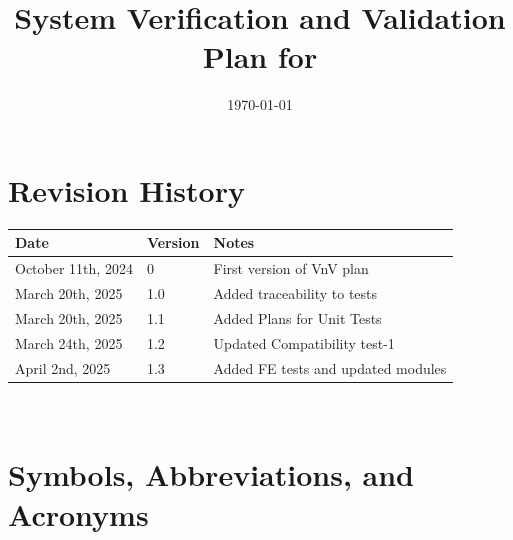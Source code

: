 \documentclass[12pt, titlepage]{article}
\begin{document}
\title{System Verification and Validation Plan for \progname{}} 
\author{\authname}
\date{\today}
	
\maketitle


\section*{Revision History}

\begin{tabularx}{\textwidth}{p{3cm}p{2cm}X}
\toprule {\bf Date} & {\bf Version} & {\bf Notes}\\
\midrule
October 11th, 2024 & 0 & First version of VnV plan\\
March 20th, 2025 & 1.0 & Added traceability to tests\\
March 20th, 2025 & 1.1 & Added Plans for Unit Tests\\
March 24th, 2025 & 1.2 & Updated Compatibility test-1 \\
April 2nd, 2025 & 1.3 & Added FE tests and updated modules\\
\bottomrule
\end{tabularx}

~\\

\newpage

\tableofcontents

\listoftables


\listoffigures


\newpage

\section{Symbols, Abbreviations, and Acronyms}
\end{document}
